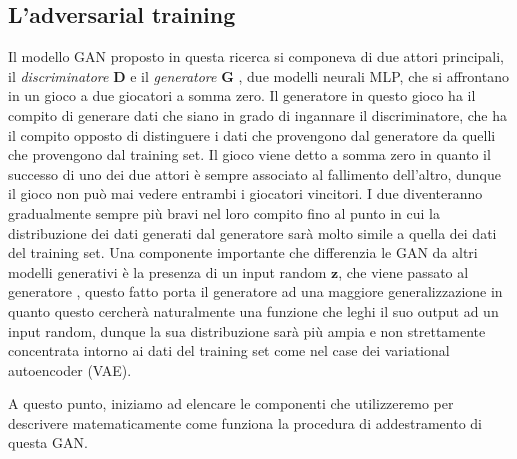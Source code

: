 \subsection{L'adversarial training}
Il modello GAN proposto in questa ricerca si componeva di due attori principali, il \textit{discriminatore} $\mathbf{D}$ e il \textit{generatore} $\mathbf{G}$
, due modelli neurali MLP, che si affrontano in un gioco a due giocatori a somma zero.
Il generatore in questo gioco ha il compito di generare dati che siano in grado di ingannare il discriminatore, che ha il compito opposto di distinguere i dati che 
provengono dal generatore da quelli che provengono dal training set. Il gioco viene detto a somma zero in quanto il successo di uno dei due attori è sempre
associato al fallimento dell'altro, dunque il gioco non può mai vedere entrambi i giocatori vincitori. 
I due diventeranno gradualmente sempre più bravi nel loro compito fino al punto
in cui la distribuzione dei dati generati dal generatore sarà molto simile a quella dei dati del training set.
Una componente importante che differenzia le GAN da altri modelli generativi è la presenza di un input random $\mathbf{z}$, che viene passato al generatore
, questo fatto porta il generatore ad una maggiore generalizzazione in quanto questo cercherà naturalmente una 
funzione che leghi il suo output ad un input random, dunque la sua distribuzione sarà più ampia e non strettamente concentrata intorno ai dati del training set
come nel case dei variational autoencoder (VAE).

A questo punto, iniziamo ad elencare le componenti che utilizzeremo per descrivere matematicamente come funziona la procedura di addestramento 
di questa GAN.

